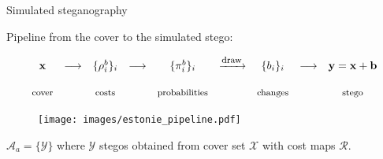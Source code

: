 \documentclass[10pt,aspectratio=169]{beamer}
\begin{document}
\begin{frame}{Simulated steganography}

Pipeline from the cover to the simulated stego:

\begin{equation*}
\begin{array}{ccccccccc}
    \mathbf{x} & \longrightarrow & \{\rho^b_i\}_i & \longrightarrow & \{\pi_i^b\}_i &   \xrightarrow{\mbox{\footnotesize{draw}}} & \{b_i\}_i &  \longrightarrow & \mathbf{y} = \mathbf{x} + \mathbf{b} \\ \\
    \mbox{\footnotesize{cover}} & & \mbox{\footnotesize{costs}} & & \mbox{\footnotesize{probabilities}} & & \mbox{\footnotesize{changes}} & &  \mbox{\footnotesize{stego}}
    
\end{array}
\end{equation*}

\pause 

\begin{figure}[h]
\centerline{\texttt{[image: images/estonie\_pipeline.pdf]}}
\end{figure}

\pause


$\mathcal{A}_a = \{\mathcal{Y}\}$ where $\mathcal{Y}$ stegos obtained from cover set $\mathcal{X}$ with cost maps $\mathcal{R}$.

\end{frame}




    
\end{document}
